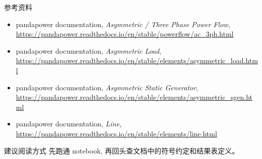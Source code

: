 \documentclass[aspectratio=169,10pt]{ctexbeamer}
\begin{document}
\begin{frame}{参考资料}
\small
\begin{itemize}
  \item pandapower documentation, \emph{Asymmetric / Three Phase Power Flow}, \url{https://pandapower.readthedocs.io/en/stable/powerflow/ac_3ph.html}
  \item pandapower documentation, \emph{Asymmetric Load}, \url{https://pandapower.readthedocs.io/en/stable/elements/asymmetric_load.html}
  \item pandapower documentation, \emph{Asymmetric Static Generator}, \url{https://pandapower.readthedocs.io/en/stable/elements/asymmetric_sgen.html}
  \item pandapower documentation, \emph{Line}, \url{https://pandapower.readthedocs.io/en/stable/elements/line.html}
\end{itemize}
\vspace{0.5em}
\begin{block}{建议阅读方式}
先跑通 notebook, 再回头查文档中的符号约定和结果表定义。
\end{block}
\end{frame}
\end{document}

